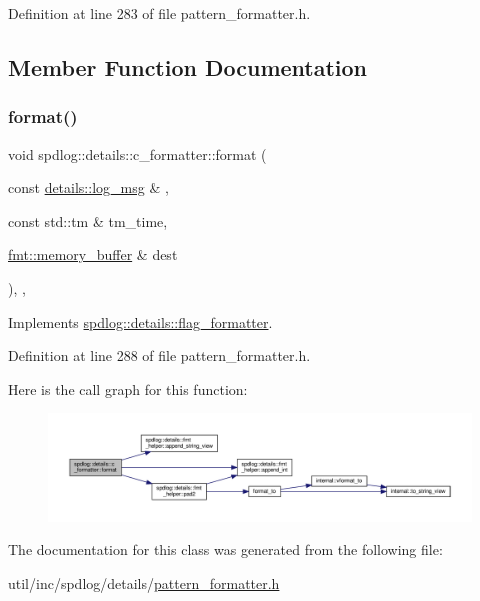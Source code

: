Definition at line 283 of file pattern\+\_\+formatter.\+h.



\subsection{Member Function Documentation}
\mbox{\label{classspdlog_1_1details_1_1c__formatter_a1b09d9e9e1d84b29fc2fb8d37fa07d57}} 
\subsubsection{\texorpdfstring{format()}{format()}}
{\footnotesize\ttfamily void spdlog\+::details\+::c\+\_\+formatter\+::format (\begin{DoxyParamCaption}\item[{const \hyperlink{structspdlog_1_1details_1_1log__msg}{details\+::log\+\_\+msg} \&}]{,  }\item[{const std\+::tm \&}]{tm\+\_\+time,  }\item[{\hyperlink{format_8h_a21cbf729f69302f578e6db21c5e9e0d2}{fmt\+::memory\+\_\+buffer} \&}]{dest }\end{DoxyParamCaption})\hspace{0.3cm}{\ttfamily [inline]}, {\ttfamily [override]}, {\ttfamily [virtual]}}



Implements \hyperlink{classspdlog_1_1details_1_1flag__formatter_a33fb3e42a4c8200cceb833d92b53fb67}{spdlog\+::details\+::flag\+\_\+formatter}.



Definition at line 288 of file pattern\+\_\+formatter.\+h.

Here is the call graph for this function\+:
\nopagebreak
\begin{figure}[H]
\begin{center}
\leavevmode
\includegraphics[width=350pt]{classspdlog_1_1details_1_1c__formatter_a1b09d9e9e1d84b29fc2fb8d37fa07d57_cgraph}
\end{center}
\end{figure}


The documentation for this class was generated from the following file\+:\begin{DoxyCompactItemize}
\item 
util/inc/spdlog/details/\hyperlink{pattern__formatter_8h}{pattern\+\_\+formatter.\+h}\end{DoxyCompactItemize}
